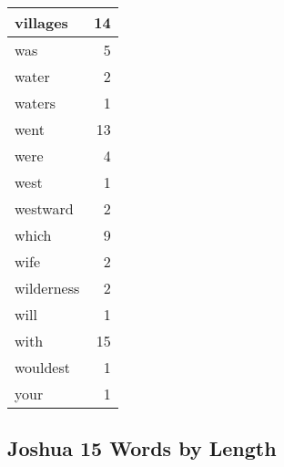 \begin{center}
\begin{longtable}{l|r}
villages & 14\\ \hline 
was & 5\\ \hline 
water & 2\\ \hline 
waters & 1\\ \hline 
went & 13\\ \hline 
were & 4\\ \hline 
west & 1\\ \hline 
westward & 2\\ \hline 
which & 9\\ \hline 
wife & 2\\ \hline 
wilderness & 2\\ \hline 
will & 1\\ \hline 
with & 15\\ \hline 
wouldest & 1\\ \hline 
your & 1\\ \hline 
\end{longtable}
\end{center}





\subsection{Joshua 15 Words by Length}


\normalsize
 
